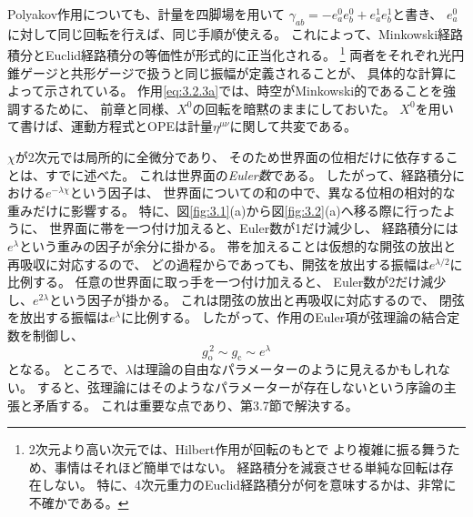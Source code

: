 Polyakov作用についても、計量を四脚場を用いて
$\gamma_{ab}=-e_a^0e_b^0+e_a^1e_b^1$と書き、
$e_a^0$に対して同じ回転を行えば、同じ手順が使える。
これによって、Minkowski経路積分とEuclid経路積分の等価性が形式的に正当化される。
\footnote[1]{2次元より高い次元では、Hilbert作用が回転のもとで
より複雑に振る舞うため、事情はそれほど簡単ではない。
経路積分を減衰させる単純な回転は存在しない。
特に、4次元重力のEuclid経路積分が何を意味するかは、非常に不確かである。}
両者をそれぞれ光円錐ゲージと共形ゲージで扱うと同じ振幅が定義されることが、
具体的な計算によって示されている。
作用\eqref{eq:3.2.3a}では、時空がMinkowski的であることを強調するために、
前章と同様、$X^0$の回転を暗黙のままにしておいた。
$X^0$を用いて書けば、運動方程式とOPEは計量$\eta^{\mu\nu}$に関して共変である。

$\chi$が2次元では局所的に全微分であり、
そのため世界面の位相だけに依存することは、すでに述べた。
これは世界面の\emph{Euler数}である。
したがって、経路積分における$e^{-\lambda\chi}$という因子は、
世界面についての和の中で、異なる位相の相対的な重みだけに影響する。
特に、図\ref{fig:3.1}(a)から図\ref{fig:3.2}(a)へ移る際に行ったように、
世界面に帯を一つ付け加えると、Euler数が1だけ減少し、
経路積分には$e^\lambda$という重みの因子が余分に掛かる。
帯を加えることは仮想的な開弦の放出と再吸収に対応するので、
どの過程からであっても、開弦を放出する振幅は$e^{\lambda/2}$に比例する。
任意の世界面に取っ手を一つ付け加えると、
Euler数が2だけ減少し、$e^{2\lambda}$という因子が掛かる。
これは閉弦の放出と再吸収に対応するので、
閉弦を放出する振幅は$e^\lambda$に比例する。
したがって、作用のEuler項が弦理論の結合定数を制御し、
\begin{equation}
g_{\mathrm o}^{\,2}\sim g_{\mathrm c}\sim e^\lambda
\tag{3.2.7}\label{eq:3.2.7}
\end{equation}
となる。
ところで、$\lambda$は理論の自由なパラメーターのように見えるかもしれない。
すると、弦理論にはそのようなパラメーターが存在しないという序論の主張と矛盾する。
これは重要な点であり、第3.7節で解決する。

